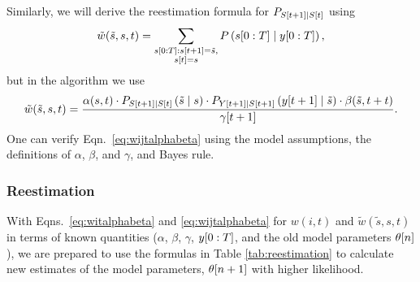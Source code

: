 Similarly, we will derive the reestimation formula for
$P_{{S}{[t+1]}\mid {S}{[t]}}$ using
\begin{equation}
  \label{eq:wijtFFE}
  {\tilde w}({\tilde s},s,t) = \sum_{\substack{s[0:T]:{s}{[t+1]}={\tilde s},\\{s}{[t]}=s}}
  P \left(s[0:T]\mid y[0:T] \right),
\end{equation}
but in the algorithm we use
\begin{equation}
  \label{eq:wijtalphabeta}
  {\tilde w}({\tilde s},s,t) = \frac{ \alpha(s,t) \cdot P_{{S}{[t+1]}\mid {S}{[t]}}
    \left({\tilde s}\mid s \right)  \cdot P_{{Y}{[t+1]}\mid {S}{[t+1]}}
    \left({y}{[t+1]}\mid {\tilde s} \right) \cdot \beta({\tilde s},t+t) }
  {{\gamma}{[t+1]}}.
\end{equation}
One can verify Eqn.~\eqref{eq:wijtalphabeta} using the model
assumptions, the definitions of $\alpha$, $\beta$, and $\gamma$, and
Bayes rule.

\subsubsection{Reestimation}

With Eqns.~\eqref{eq:witalphabeta} and \eqref{eq:wijtalphabeta} for
$w(i,t)$ and ${\tilde w}({\tilde s},s,t)$ in terms of known quantities
($\alpha$, $\beta$, $\gamma$, $y[0:T]$, and the old model
parameters ${\theta}{[n]}$), we are prepared to use the formulas
in Table \ref{tab:reestimation} to calculate new estimates of the
model parameters, ${\theta}{[n+1]}$ with higher likelihood.

